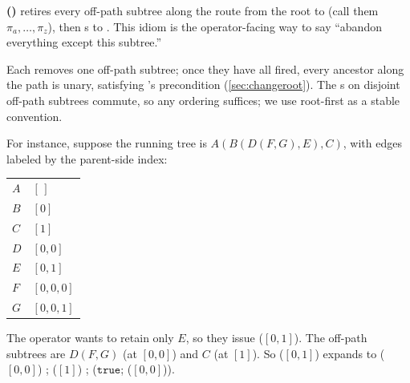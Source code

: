 \item \textbf{\PruneDownTo(\pth)} retires every off-path subtree along the route from the root to \pth (call them \(\pi_a, \ldots, \pi_z\)), then \ChangeRoot{}s to \pth.
This idiom is the operator-facing way to say ``abandon everything except this subtree.''

Each \Retire{} removes one off-path subtree; once they have all fired, every ancestor along the path is unary, satisfying \ChangeRoot's precondition (\cref{sec:changeroot}).
The \Retire{}s on disjoint off-path subtrees commute, so any ordering suffices; we use root-first as a stable convention.

For instance, suppose the running tree is \(A(B(D(F,\allowbreak G), E),\allowbreak C)\), with edges labeled by the parent-side index:

\begin{center}
\begin{minipage}{0.55\linewidth}
\centering
{}
\end{minipage}%
\begin{minipage}{0.35\linewidth}
\centering
\small
\begin{tabular}{@{}l@{\quad}l@{}}
\(A\) & \([\,]\) \\
\(B\) & \([0]\) \\
\(C\) & \([1]\) \\
\(D\) & \([0,0]\) \\
\(E\) & \([0,1]\) \\
\(F\) & \([0,0,0]\) \\
\(G\) & \([0,0,1]\) \\
\end{tabular}
\end{minipage}
\end{center}
The operator wants to retain only \(E\), so they issue \PruneDownTo(\([0,1]\)).
The off-path subtrees are \(D(F, G)\) (at \([0,0]\)) and \(C\) (at \([1]\)).
So \PruneDownTo(\([0,1]\)) expands to \Retire(\([0,0]\)) ; \Retire(\([1]\)) ; (\(\mathtt{true}\); \ChangeRoot(\([0,0]\))).

